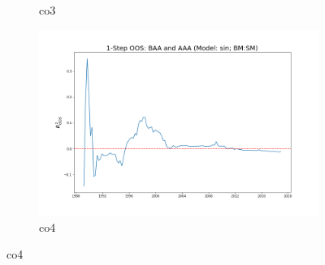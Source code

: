 \documentclass[a4paper,12pt,times,numbered,print,index]{report}
\numberwithin{equation}{section}
\begin{document}
\begin{figure}[!htbp]
\begin{subfigure}[b]{0.42\linewidth}
		\caption{co3}
	\end{subfigure}
	\begin{subfigure}[b]{0.42\linewidth}
		\includegraphics[width=0.9\linewidth]{OOS_plots/sin_co4_SM.png}
		\caption{co4}
	\end{subfigure}
	\label{g1}
\end{figure}
\end{document}
